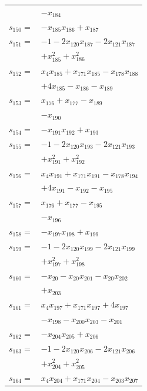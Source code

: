\begin{longtable}{@{}r@{\;}l@{}}
 & \(\displaystyle -x_{184}\) \\[3pt]
\(s_{150}=\) & \(\displaystyle -x_{185}x_{186} +x_{187}\) \\[3pt]
\(s_{151}=\) & \(\displaystyle -1 -2x_{120}x_{187} -2x_{121}x_{187}\) \\
 & \(\displaystyle +x_{185}^{2} +x_{186}^{2}\) \\[3pt]
\(s_{152}=\) & \(\displaystyle x_{4}x_{185} +x_{171}x_{185} -x_{178}x_{188}\) \\
 & \(\displaystyle +4x_{185} -x_{186} -x_{189}\) \\[3pt]
\(s_{153}=\) & \(\displaystyle x_{176} +x_{177} -x_{189}\) \\
 & \(\displaystyle -x_{190}\) \\[3pt]
\(s_{154}=\) & \(\displaystyle -x_{191}x_{192} +x_{193}\) \\[3pt]
\(s_{155}=\) & \(\displaystyle -1 -2x_{120}x_{193} -2x_{121}x_{193}\) \\
 & \(\displaystyle +x_{191}^{2} +x_{192}^{2}\) \\[3pt]
\(s_{156}=\) & \(\displaystyle x_{4}x_{191} +x_{171}x_{191} -x_{178}x_{194}\) \\
 & \(\displaystyle +4x_{191} -x_{192} -x_{195}\) \\[3pt]
\(s_{157}=\) & \(\displaystyle x_{176} +x_{177} -x_{195}\) \\
 & \(\displaystyle -x_{196}\) \\[3pt]
\(s_{158}=\) & \(\displaystyle -x_{197}x_{198} +x_{199}\) \\[3pt]
\(s_{159}=\) & \(\displaystyle -1 -2x_{120}x_{199} -2x_{121}x_{199}\) \\
 & \(\displaystyle +x_{197}^{2} +x_{198}^{2}\) \\[3pt]
\(s_{160}=\) & \(\displaystyle -x_{20} -x_{20}x_{201} -x_{20}x_{202}\) \\
 & \(\displaystyle +x_{203}\) \\[3pt]
\(s_{161}=\) & \(\displaystyle x_{4}x_{197} +x_{171}x_{197} +4x_{197}\) \\
 & \(\displaystyle -x_{198} -x_{200}x_{203} -x_{201}\) \\[3pt]
\(s_{162}=\) & \(\displaystyle -x_{204}x_{205} +x_{206}\) \\[3pt]
\(s_{163}=\) & \(\displaystyle -1 -2x_{120}x_{206} -2x_{121}x_{206}\) \\
 & \(\displaystyle +x_{204}^{2} +x_{205}^{2}\) \\[3pt]
\(s_{164}=\) & \(\displaystyle x_{4}x_{204} +x_{171}x_{204} -x_{203}x_{207}\) \\

\end{longtable}
